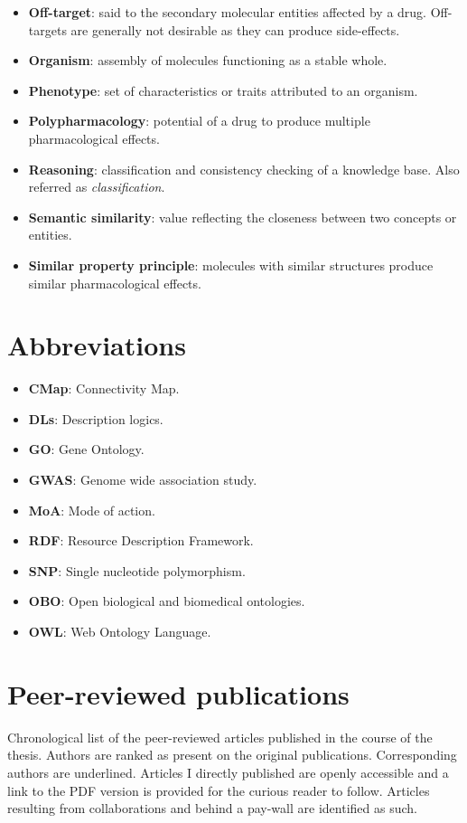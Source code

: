 \begin{itemize}
  \item \textbf{Off-target}: said to the secondary molecular entities affected by a drug. Off-targets are generally not desirable as they can produce side-effects.
  \item \textbf{Organism}: assembly of molecules functioning as a stable whole.
  \item \textbf{Phenotype}: set of characteristics or traits attributed to an organism.
  \item \textbf{Polypharmacology}: potential of a drug to produce multiple pharmacological effects.
  \item \textbf{Reasoning}: classification and consistency checking of a knowledge base. Also referred as \emph{classification}.
  \item \textbf{Semantic similarity}: value reflecting the closeness between two concepts or entities.
  \item \textbf{Similar property principle}: molecules with similar structures produce similar pharmacological effects.
\end{itemize}

\chapter{Abbreviations}
\begin{itemize}
  \item \textbf{CMap}: Connectivity Map.
  \item \textbf{DLs}: Description logics.
  \item \textbf{GO}: Gene Ontology.
  \item \textbf{GWAS}: Genome wide association study.
  \item \textbf{MoA}: Mode of action.
  \item \textbf{RDF}: Resource Description Framework.
  \item \textbf{SNP}: Single nucleotide polymorphism.
  \item \textbf{OBO}: Open biological and biomedical ontologies.
  \item \textbf{OWL}: Web Ontology Language.
\end{itemize}

\chapter{Peer-reviewed publications}
Chronological list of the peer-reviewed articles published in the course of the thesis. Authors are ranked as present on the original publications. Corresponding authors are underlined. Articles I directly published are openly accessible and a link to the PDF version is provided for the curious reader to follow. Articles resulting from collaborations and behind a pay-wall are identified as such.

